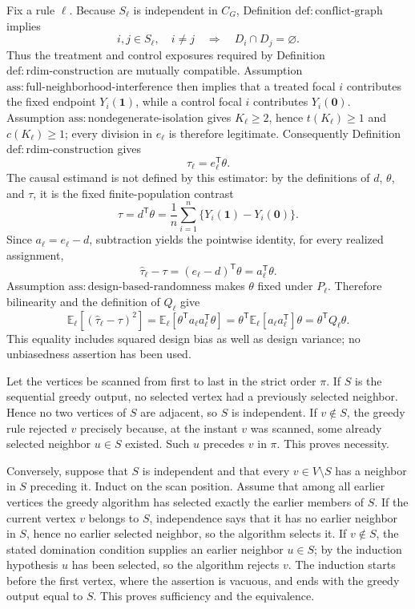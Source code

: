 Fix a rule \(\ell\).  Because \(S_{\ell}\) is independent in \(C_G\), Definition \(\mathrm{def:conflict\mbox{-}graph}\) implies
\[
 i,j\in S_{\ell},\quad i\ne j
 \quad\Longrightarrow\quad
 D_i\cap D_j=\varnothing.
\]
Thus the treatment and control exposures required by Definition \(\mathrm{def:rdim\mbox{-}construction}\) are mutually compatible.  Assumption \(\mathrm{ass:full\mbox{-}neighborhood\mbox{-}interference}\) then implies that a treated focal \(i\) contributes the fixed endpoint \(Y_i(\mathbf 1)\), while a control focal \(i\) contributes \(Y_i(\mathbf 0)\).  Assumption \(\mathrm{ass:nondegenerate\mbox{-}isolation}\) gives \(K_{\ell}\ge2\), hence \(t(K_{\ell})\ge1\) and \(c(K_{\ell})\ge1\); every division in \(e_{\ell}\) is therefore legitimate.  Consequently Definition \(\mathrm{def:rdim\mbox{-}construction}\) gives
\[
 \widehat\tau_{\ell}=e_{\ell}^{\mathsf T}\theta.
\]
The causal estimand is not defined by this estimator: by the definitions of \(d\), \(\theta\), and \(\tau\), it is the fixed finite-population contrast
\[
 \tau=d^{\mathsf T}\theta
 =\frac1n\sum_{i=1}^n\{Y_i(\mathbf 1)-Y_i(\mathbf 0)\}.
\]
Since \(a_{\ell}=e_{\ell}-d\), subtraction yields the pointwise identity, for every realized assignment,
\[
 \widehat\tau_{\ell}-\tau
 =(e_{\ell}-d)^{\mathsf T}\theta
 =a_{\ell}^{\mathsf T}\theta.
\]
Assumption \(\mathrm{ass:design\mbox{-}based\mbox{-}randomness}\) makes \(\theta\) fixed under \(P_{\ell}\).  Therefore bilinearity and the definition of \(Q_{\ell}\) give
\[
 \mathbb E_{\ell}\!\left[(\widehat\tau_{\ell}-\tau)^2\right]
 =\mathbb E_{\ell}\!\left[\theta^{\mathsf T}a_{\ell}a_{\ell}^{\mathsf T}\theta\right]
 =\theta^{\mathsf T}\mathbb E_{\ell}[a_{\ell}a_{\ell}^{\mathsf T}]\theta
 =\theta^{\mathsf T}Q_{\ell}\theta.
\]
This equality includes squared design bias as well as design variance; no unbiasedness assertion has been used.

Let the vertices be scanned from first to last in the strict order \(\pi\).  If \(S\) is the sequential greedy output, no selected vertex had a previously selected neighbor.  Hence no two vertices of \(S\) are adjacent, so \(S\) is independent.  If \(v\notin S\), the greedy rule rejected \(v\) precisely because, at the instant \(v\) was scanned, some already selected neighbor \(u\in S\) existed.  Such \(u\) precedes \(v\) in \(\pi\).  This proves necessity.

Conversely, suppose that \(S\) is independent and that every \(v\in V\setminus S\) has a neighbor in \(S\) preceding it.  Induct on the scan position.  Assume that among all earlier vertices the greedy algorithm has selected exactly the earlier members of \(S\).  If the current vertex \(v\) belongs to \(S\), independence says that it has no earlier neighbor in \(S\), hence no earlier selected neighbor, so the algorithm selects it.  If \(v\notin S\), the stated domination condition supplies an earlier neighbor \(u\in S\); by the induction hypothesis \(u\) has been selected, so the algorithm rejects \(v\).  The induction starts before the first vertex, where the assertion is vacuous, and ends with the greedy output equal to \(S\).  This proves sufficiency and the equivalence.

